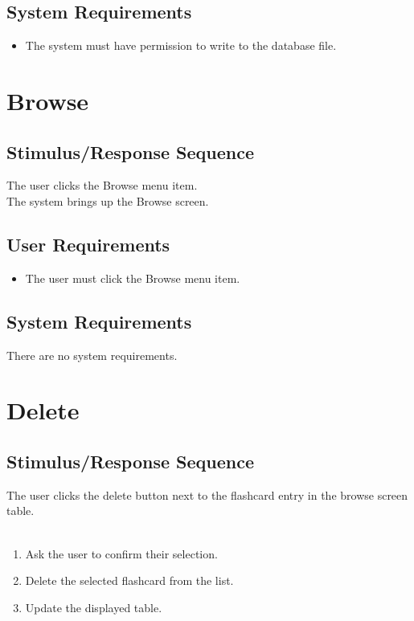 \documentclass{scrreprt}
\begin{document}
    \subsection{System Requirements}
        \begin{itemize}
            \item The system must have permission to write to the database file.
        \end{itemize}

\section{Browse}
    \subsection{Stimulus/Response Sequence}
        \begin{flushleft}
             The user clicks the Browse menu item. \\
             The system brings up the Browse screen. \\
        \end{flushleft}

    \subsection{User Requirements}
        \begin{itemize}
            \item The user must click the Browse menu item.
        \end{itemize}

    \subsection{System Requirements}
        There are no system requirements.

\section{Delete}
    \subsection{Stimulus/Response Sequence}
        \begin{flushleft}
             The user clicks the delete button next to the flashcard entry in the browse screen table. \\
             \\
            \begin{enumerate}[1.]
                \item Ask the user to confirm their selection.
                \item Delete the selected flashcard from the list.
                \item Update the displayed table.
            \end{enumerate}
        \end{flushleft}
\end{document}
